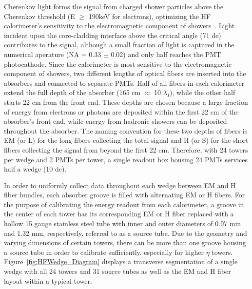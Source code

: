 Cherenkov light forms the signal from charged shower particles above the Cherenkov threshold (E $\ge$
190keV for electrons), optimizing the HF calorimeter's sensitivity to the electromagnetic component of
showers~\cite{Akchurin:2955}. Light incident upon the core-cladding interface above the critical angle
(71 de) contributes to the signal, although a small fraction of light is captured in the
numerical aperature (NA = 0.33 $\pm$ 0.02) and only half reaches the PMT photocathode. Since the
calorimeter is most sensitive to the electromagnetic component of showers, two different lengths of
optical fibers are inserted into the absorbers and connected to separate PMTs. Half of all fibers in
each calorimeter extend the full depth of the absorber (165 cm $\approx$ 10 $\lambda_I$), while the other
half starts 22 cm from the front end. These depths are chosen because a large fraction of energy from
electrons or photons are deposited within the first 22 cm of the absorber's front end, while energy
from hadronic showers can be deposited throughout the absorber. The naming convention for these two
depths of fibers is EM (or L) for the long fibers collecting the total signal and H (or S) for the
short fibers collecting the signal from beyond the first 22 cm. Therefore, with 24 towers per wedge
and 2 PMTs per tower, a single readout box housing 24 PMTs services half a wedge (10 de).

In order to uniformly collect data throughout each wedge between EM and H fiber bundles, each absorber
groove is filled with alternating EM or H fibers. For the purpose of calibrating the energy readout
from each calorimeter, a groove in the center of each tower has its corresponding EM or H fiber
replaced with a hollow 15 gauge stainless steel tube with inner and outer diameters of 0.97 mm and
1.32 mm, respectively, referred to as a source tube. Due to the geometry and  varying dimensions of certain towers,
there can be more than one groove housing a source tube in order to calibrate sufficiently, especially for higher $\eta$ towers.
Figure~\ref{fig:HFWedge_Diagram} displays a transverse segmentation of a single wedge with all 24
towers and 31 source tubes as well as the EM and H fiber layout within a typical tower.


